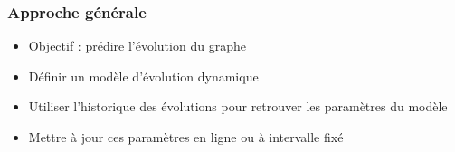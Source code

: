 \documentclass[c]{beamer}
\begin{document}
\begin{frame}
    \frametitle{Approche générale}
    \begin{itemize}
        \item Objectif : prédire l'évolution du graphe
        \item Définir un modèle d'évolution dynamique
        \item Utiliser l'historique des évolutions pour retrouver
            les paramètres du modèle
        \item Mettre à jour ces paramètres en ligne ou à intervalle fixé
    \end{itemize}
\end{frame}
\end{document}
